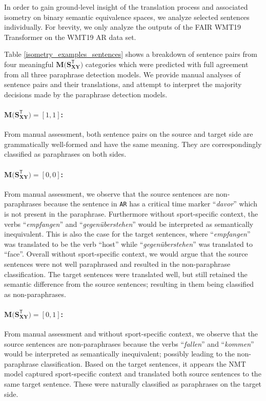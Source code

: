 \documentclass[11pt,a4paper]{article}
\begin{document}
In order to gain ground-level insight of the translation process and associated isometry on binary semantic equivalence spaces, we analyze selected sentences individually. For brevity, we only analyze the outputs of the FAIR WMT19 Transformer on the WMT19 AR data set.

Table \ref{isometry_examples_sentences} shows a breakdown of sentence pairs from four meaningful $\mathbf{M(S_{XY}^{\mathsf{T}}})$ categories which were predicted with full agreement from all three paraphrase detection models. We provide manual analyses of sentence pairs and their translations, and attempt to interpret the majority decisions made by the paraphrase detection models.

\paragraph{$\mathbf{M(S_{XY}^{\mathsf{T}}}) = [1,1]$:} From manual assessment, both sentence pairs on the source and target side are grammatically well-formed and have the same meaning. They are correspondingly classified as paraphrases on both sides.
\paragraph{$\mathbf{M(S_{XY}^{\mathsf{T}}}) = [0,0]$:} From manual assessment, we observe that the source sentences are non-paraphrases because the sentence in \texttt{AR} has a critical time marker ``\textit{davor}'' which is not present in the paraphrase. Furthermore without sport-specific context, the verbs ``\textit{empfangen}'' and ``\textit{gegenüberstehen}'' would be interpreted as semantically inequivalent. This is also the case for the target sentences, where ``\textit{empfangen}'' was translated to be the verb ``host'' while ``\textit{gegenüberstehen}'' was translated to ``face''. Overall without sport-specific context, we would argue that the source sentences were not well paraphrased and resulted in the non-paraphrase classification. The target sentences were translated well, but still retained the semantic difference from the source sentences; resulting in them being classified as non-paraphrases.
\paragraph{$\mathbf{M(S_{XY}^{\mathsf{T}}}) = [0,1]$:} From manual assessment and without sport-specific context, we observe that the source sentences are non-paraphrases because the verbs ``\textit{fallen}'' and ``\textit{kommen}'' would be interpreted as semantically inequivalent; possibly leading to the non-paraphrase classification. Based on the target sentences, it appears the NMT model captured sport-specific context and translated both source sentences to the same target sentence. These were naturally classified as paraphrases on the target side.
\end{document}
